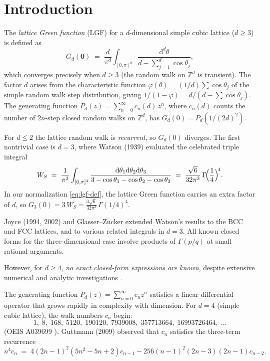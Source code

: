 \documentclass[12pt,a4paper]{article}
\numberwithin{equation}{section}
\theoremstyle{plain}
\theoremstyle{definition}
\theoremstyle{remark}
\newcommand{\Z}{\mathbb{Z}}
\newcommand{\dd}{\mathrm{d}}
\begin{document}
\section{Introduction}

The \emph{lattice Green function} (LGF) for a $d$-dimensional simple cubic lattice ($d \geq 3$) is defined as
\begin{equation}\label{eq:lgf-def}
  G_d(\boldsymbol{0}) \;=\; \frac{d}{\pi^d}\int_{[0,\pi]^d}
  \frac{\dd^d \theta}{d - \sum_{j=1}^d \cos\theta_j},
\end{equation}
which converges precisely when $d \geq 3$ (the random walk on $\Z^d$ is transient).
The factor $d$ arises from the characteristic function $\varphi(\theta) = (1/d)\sum\cos\theta_j$
of the simple random walk step distribution, giving $1/(1-\varphi) = d/(d - \sum\cos\theta_j)$.
The generating function $P_d(z) = \sum_{n=0}^\infty c_n(d)\,z^n$, where $c_n(d)$ counts the number
of $2n$-step closed random walks on $\Z^d$, has $G_d(0) = P_d(1/(2d)^2)$.

For $d \leq 2$ the lattice random walk is \emph{recurrent}, so $G_d(0)$ diverges.
The first nontrivial case is $d = 3$, where Watson (1939) \cite{Watson1939} evaluated
the celebrated triple integral
\[
  W_S \;=\; \frac{1}{\pi^3} \int_{[0,\pi]^3}
  \frac{\dd\theta_1 \dd\theta_2 \dd\theta_3}{3 - \cos\theta_1 - \cos\theta_2 - \cos\theta_3}
  \;=\; \frac{\sqrt{6}}{32\pi^3}\,\Gamma\!\Bigl(\frac{1}{4}\Bigr)^{\!4}.
\]
In our normalization \eqref{eq:lgf-def}, the lattice Green function carries an extra factor of $d$,
so $G_3(0) = 3\,W_S = \frac{3\sqrt{6}}{32\pi^3}\,\Gamma(1/4)^4$.

Joyce (1994, 2002) \cite{Joyce1994,Joyce2002} and Glasser--Zucker \cite{GlasserZucker1977}
extended Watson's results to the BCC and FCC lattices, and to various related integrals in $d = 3$.
All known closed forms for the three-dimensional case involve products of $\Gamma(p/q)$ at
small rational arguments.

However, for $d \geq 4$, \emph{no exact closed-form expressions are known},
despite extensive numerical and analytic investigations \cite{Guttmann2009,Zucker2011,BBC2006}.

The generating function $P_d(z) = \sum_{n=0}^\infty c_n z^n$ satisfies a linear differential operator
that grows rapidly in complexity with dimension. For $d = 4$ (simple cubic lattice),
the walk numbers $c_n$ begin:
\[
  1,\; 8,\; 168,\; 5120,\; 190120,\; 7939008,\; 357713664,\; 16993726464,\; \ldots
\]
(OEIS A039699 \cite{OEIS}). Guttmann (2009) \cite{Guttmann2009} observed that $c_n$ satisfies the three-term recurrence
\begin{equation}\label{eq:4d-recurrence}
  n^4 c_n \;=\; 4(2n-1)^2(5n^2 - 5n + 2) c_{n-1} - 256(n-1)^2(2n-3)(2n-1) c_{n-2}.
\end{equation}
\end{document}

